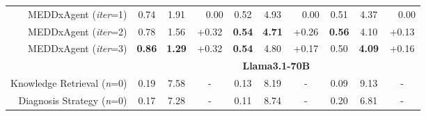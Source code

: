\begin{table*}[ht]
\begin{tabular}{rccccccccc}
 MEDDxAgent (\textit{iter}=1)                       & 0.74           & 1.91     & ~~0.00 & 0.52        & 4.93      &  ~~0.00   & 0.51         & 4.37        &   ~~0.00\\
MEDDxAgent (\textit{iter}=2)                       & 0.78           & 1.56    & +0.32  & \textbf{0.54}        & \textbf{4.71}    &    +0.26   & \textbf{0.56}         & 4.10   &     +0.13   \\
MEDDxAgent (\textit{iter}=3)                       & \textbf{0.86}           & \textbf{1.29}    & +0.32  & \textbf{0.54}        & 4.80      & +0.17    & 0.50         & \textbf{4.09}       &   +0.16 \\\midrule
                               & \multicolumn{9}{c}{\textbf{Llama3.1-70B}}                                                           \\ \midrule
Knowledge Retrieval (\textit{n}=0)           &   0.19         &  7.58  &  -  &      0.13   &   8.19      & -  &    0.09      &  9.13  &    -   \\
Diagnosis Strategy (\textit{n}=0)    &        0.17        &       7.28     &       -      &      0.11          &      8.74        &          -      &       0.20       &      6.81       &           -      \\

\end{tabular}
\end{table*}
